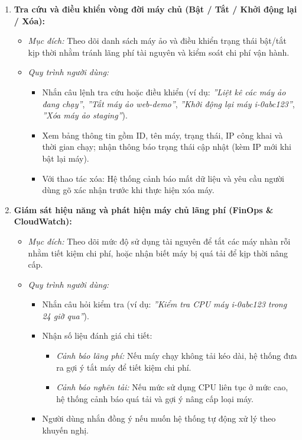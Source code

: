 \documentclass[a4paper,12pt]{article}
\begin{document}
\begin{enumerate}
  \item \textbf{Tra cứu và điều khiển vòng đời máy chủ (Bật / Tắt / Khởi động lại / Xóa):}
  \begin{itemize}
    \item \textit{Mục đích:} Theo dõi danh sách máy ảo và điều khiển trạng thái bật/tắt kịp thời nhằm tránh lãng phí tài nguyên và kiểm soát chi phí vận hành.
    \item \textit{Quy trình người dùng:}
    \begin{itemize}
      \item Nhắn câu lệnh tra cứu hoặc điều khiển (ví dụ: \textit{''Liệt kê các máy ảo đang chạy''}, \textit{''Tắt máy ảo web-demo''}, \textit{''Khởi động lại máy i-0abc123''}, \textit{''Xóa máy ảo staging''}).
      \item Xem bảng thông tin gồm ID, tên máy, trạng thái, IP công khai và thời gian chạy; nhận thông báo trạng thái cập nhật (kèm IP mới khi bật lại máy).
      \item Với thao tác xóa: Hệ thống cảnh báo mất dữ liệu và yêu cầu người dùng gõ xác nhận trước khi thực hiện xóa máy.
    \end{itemize}
  \end{itemize}

  \item \textbf{Giám sát hiệu năng và phát hiện máy chủ lãng phí (FinOps \& CloudWatch):}
  \begin{itemize}
    \item \textit{Mục đích:} Theo dõi mức độ sử dụng tài nguyên để tắt các máy nhàn rỗi nhằm tiết kiệm chi phí, hoặc nhận biết máy bị quá tải để kịp thời nâng cấp.
    \item \textit{Quy trình người dùng:}
    \begin{itemize}
      \item Nhắn câu hỏi kiểm tra (ví dụ: \textit{''Kiểm tra CPU máy i-0abc123 trong 24 giờ qua''}).
      \item Nhận số liệu đánh giá chi tiết:
      \begin{itemize}
        \item \textit{Cảnh báo lãng phí:} Nếu máy chạy không tải kéo dài, hệ thống đưa ra gợi ý tắt máy để tiết kiệm chi phí.
        \item \textit{Cảnh báo nghẽn tải:} Nếu mức sử dụng CPU liên tục ở mức cao, hệ thống cảnh báo quá tải và gợi ý nâng cấp loại máy.
      \end{itemize}
      \item Người dùng nhắn đồng ý nếu muốn hệ thống tự động xử lý theo khuyến nghị.
    \end{itemize}
  \end{itemize}


\end{enumerate}
\end{document}
